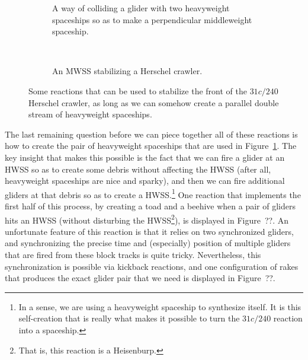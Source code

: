 \begin{figure}[!htb]
	\centering
	\begin{subfigure}[b]{0.43\textwidth}
		\centering
		\caption{A way of colliding a glider with two heavyweight spaceships so as to make a perpendicular middleweight spaceship.}\label{fig:g_2h_to_m}
	\end{subfigure} \ \	\ \ \begin{subfigure}[b]{0.53\textwidth}
		\centering
		\caption{An MWSS stabilizing a Herschel crawler.}\label{fig:herschel_mwss_stabilize}
	\end{subfigure}
	\caption{Some reactions that can be used to stabilize the front of the $31c/240$ Herschel crawler, as long as we can somehow create a parallel double stream of heavyweight spaceships.}\label{fig:silverfish_mwss_reactions}
\end{figure}

The last remaining question before we can piece together all of these reactions is how to create the pair of heavyweight spaceships that are used in Figure~\ref{fig:g_2h_to_m}. The key insight that makes this possible is the fact that we can fire a glider at an HWSS so as to create some debris without affecting the HWSS (after all, heavyweight spaceships are nice and sparky), and then we can fire additional gliders at that debris so as to create a HWSS.\footnote{In a sense, we are using a heavyweight spaceship to synthesize itself. It is this self-creation that is really what makes it possible to turn the $31c/240$ reaction into a spaceship.} One reaction that implements the first half of this process, by creating a toad and a beehive when a pair of gliders hits an HWSS (without disturbing the HWSS\footnote{That is, this reaction is a Heisenburp.}), is displayed in Figure~??. An unfortunate feature of this reaction is that it relies on two synchronized gliders, and synchronizing the precise time and (especially) position of multiple gliders that are fired from these block tracks is quite tricky. Nevertheless, this synchronization is possible via kickback reactions, and one configuration of rakes that produces the exact glider pair that we need is displayed in Figure~??.


